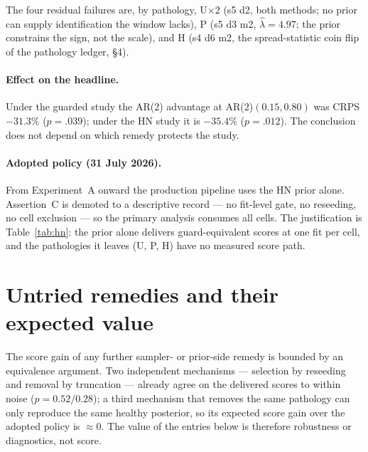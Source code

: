 \documentclass[11pt]{article}
\begin{document}
The four residual failures are, by pathology, U$\times$2 (s5 d2, both
methods; no prior can supply identification the window lacks), P
(s5 d3 m2, $\hat\lambda = 4.97$; the prior constrains the sign, not the
scale), and H (s4 d6 m2, the spread-statistic coin flip of the
pathology ledger, \S4).

\paragraph{Effect on the headline.} Under the guarded study the AR(2)
advantage at AR(2)$(0.15, 0.80)$ was CRPS $-31.3\%$ ($p = .039$); under
the HN study it is $-35.4\%$ ($p = .012$). The conclusion does not
depend on which remedy protects the study.

\paragraph{Adopted policy (31 July 2026).} From Experiment~A onward the
production pipeline uses the HN prior alone. Assertion~C is demoted to a
descriptive record --- no fit-level gate, no reseeding, no cell
exclusion --- so the primary analysis consumes all cells. The
justification is Table~\ref{tab:hn}: the prior alone delivers
guard-equivalent scores at one fit per cell, and the pathologies it
leaves (U, P, H) have no measured score path.

\section{Untried remedies and their expected value}

The score gain of any further sampler- or prior-side remedy is bounded
by an equivalence argument. Two independent mechanisms --- selection by
reseeding and removal by truncation --- already agree on the delivered
scores to within noise ($p = 0.52/0.28$); a third mechanism that removes
the same pathology can only reproduce the same healthy posterior, so its
expected score gain over the adopted policy is $\approx 0$. The value of
the entries below is therefore robustness or diagnostics, not score.
\end{document}
